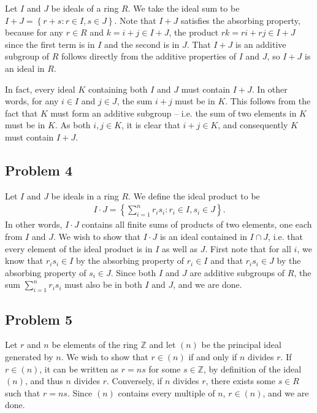 \documentclass{../../mathnotes}
\begin{document}
Let $I$ and $J$ be ideals of a ring $R$. We take the ideal sum to be $I+J=\left\{ r+s:r\in I,s\in J \right\}$.
Note that $I+J$ satisfies the absorbing property, because for any $r\in R$ and $k=i+j\in I+J$, the product
$rk=ri+rj\in I+J$ since the first term is in $I$ and the second is in $J$. That $I+J$ is an additive subgroup of $R$
follows directly from the additive properties of $I$ and $J$, so $I+J$ is an ideal in $R$.

In fact, every ideal $K$ containing both $I$ and $J$ must contain $I+J$. In other words, for any $i\in I$ and $j\in J$,
the sum $i+j$ must be in $K$. This follows from the fact that $K$ must form an additive subgroup -- i.e. the sum of
two elements in $K$ must be in $K$. As both $i,j\in K$, it is clear that $i+j\in K$, and consequently $K$ must contain
$I+J$.

\subsection*{Problem 4}

Let $I$ and $J$ be ideals in a ring $R$. We define the ideal product to be
\begin{align*}
    I\cdot J=\left\{ \sum_{i=1}^n r_is_i:r_i\in I,s_i\in J \right\}.
\end{align*}
In other words, $I\cdot J$ contains all finite sums of products of two elements, one each from $I$ and $J$. We wish
to show that $I\cdot J$ is an ideal contained in $I\cap J$, i.e. that every element of the ideal product is in $I$ as well as
$J$. First note that for all $i$, we know that $r_is_i\in I$ by the absorbing property of $r_i\in I$ and that $r_is_i\in J$
by the absorbing property of $s_i\in J$. Since both $I$ and $J$ are additive subgroups of $R$, the sum $\sum_{i=1}^nr_is_i$
must also be in both $I$ and $J$, and we are done.

\subsection*{Problem 5}

Let $r$ and $n$ be elements of the ring $\mathbb{Z}$ and let $(n)$ be the principal ideal generated by $n$. We wish to
show that $r\in(n)$ if and only if $n$ divides $r$. If $r\in (n)$, it can be written as $r=ns$ for some $s\in\mathbb{Z}$,
by definition of the ideal $(n)$, and thus $n$ divides $r$.
Conversely, if $n$ divides $r$, there exists some $s\in R$ such that $r=ns$. Since $(n)$ contains every multiple of $n$,
$r\in(n)$, and we are done.
\end{document}

